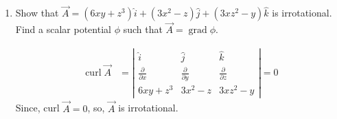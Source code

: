 \begin{enumerate}
\begin{answer}
\begin{align}
		\nabla \times \vec{F}&=\left|\begin{array}{ccc}\hat{i} & \hat{j} & \hat{k} \\ \frac{\partial}{\partial x} & \frac{\partial}{\partial y} & \frac{\partial}{\partial z} \\ 2 x y+z^{3} & x^{2} & 3 z^{2} x\end{array}\right|=0\notag
		\intertext{So, $\vec{F}$ is conservative field, it can be expressed as gradient of scalar $\phi$.}
		\vec{F} &=\nabla \phi \notag\\ \Rightarrow \quad\left(2 x y+z^{3}\right) \hat{i}+x^{2} \hat{j}+3 z^{2} x \hat{k} &=\frac{\partial \phi}{\partial x} \hat{i}+\frac{\partial \phi}{\partial y} \hat{j}+\frac{\partial \phi}{\partial z} \hat{k} \notag\\
		\frac{\partial \phi}{\partial x}&=2 x y+z^{3} \quad \Rightarrow \quad \phi=x^{2} y+x z^{3}\dots\label{VI-9}\\
		\frac{\partial \phi}{\partial y}&=x^{2} \quad \Rightarrow \quad \phi=x^{2} y\dots\label{VI-10}\\
		\frac{\partial \phi}{\partial z}&=3 z^{2} x \quad \Rightarrow \quad \phi=x z^{3}\dots\label{VI-11}
		\intertext{Adding (\ref{VI-9}), (\ref{VI-10}), (\ref{VI-11}) and writing the common term once}
		\phi&=x^{2} y+x z^{3}\notag
		\intertext{Work done in moving a particle from $(1,-2,1)$ to $(3,1,4)$}
		 W &=\int \vec{F} \cdot d \vec{r}=\int d \phi \notag\\ &=\left[x^{2} y+x z^{3}\right]_{(1,-2,1)}^{(3,1,4)}=200 \notag
		\end{align}
	\end{answer}
	\item Show that $\vec{A}=\left(6 x y+z^{3}\right) \hat{i}+\left(3 x^{2}-z\right) \hat{j}+\left(3 x z^{2}-y\right) \hat{k}$ is irrotational. Find a scalar potential $\phi$ such that $\vec{A}=\operatorname{grad} \phi .$
	\begin{answer}
		\begin{align*}
		\operatorname{curl} \vec{A}&=\left|\begin{array}{ccc}\hat{i} & \hat{j} & \hat{k} \\ \frac{\partial}{\partial x} & \frac{\partial}{\partial y} & \frac{\partial}{\partial z} \\ 6 x y+z^{3} & 3 x^{2}-z & 3 x z^{2}-y\end{array}\right|=0
		\end{align*}
		Since, curl $\vec{A}=0$, so, $\vec{A}$ is irrotational.\\

\end{answer}
\end{enumerate}

